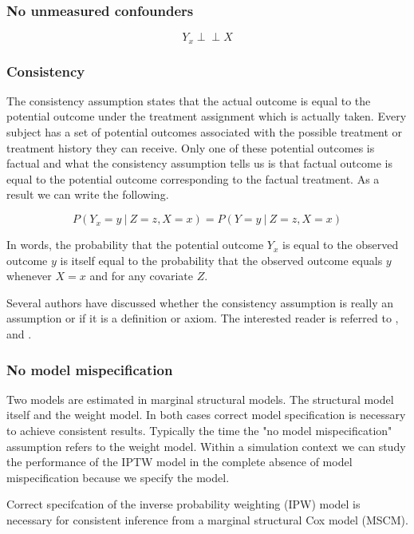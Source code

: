 \documentclass[11pt]{article}
\begin{document}
\subsubsection{No unmeasured
confounders}\label{no-unmeasured-confounders}

\[Y_{x} \perp\!\!\!\perp X\]

\subsubsection{Consistency}\label{consistency}

The consistency assumption states that the actual outcome is equal to
the potential outcome under the treatment assignment which is actually
taken. Every subject has a set of potential outcomes associated with the
possible treatment or treatment history they can receive. Only one of
these potential outcomes is factual and what the consistency assumption
tells us is that factual outcome is equal to the potential outcome
corresponding to the factual treatment. As a result we can write the
following.

\[P(Y_x = y\ |\ Z = z, X = x) = P(Y = y\ |\ Z = z, X = x)\]

In words, the probability that the potential outcome \(Y_x\) is equal to
the observed outcome \(y\) is itself equal to the probability that the
observed outcome equals \(y\) whenever \(X = x\) and for any covariate
\(Z\).

Several authors have discussed whether the consistency assumption is
really an assumption or if it is a definition or axiom. The interested
reader is referred to \citet{VanderWeele2009}, \citet{Cole2009} and
\citet{Pearl2010}.

\subsubsection{No model mispecification}\label{no-model-mispecification}

Two models are estimated in marginal structural models. The structural
model itself and the weight model. In both cases correct model
specification is necessary to achieve consistent results. Typically the
time the "no model mispecification" assumption refers to the weight
model. Within a simulation context we can study the performance of the
IPTW model in the complete absence of model mispecification because we
specify the model.

Correct specifcation of the inverse probability weighting (IPW) model is
necessary for consistent inference from a marginal structural Cox model
(MSCM).
\end{document}
